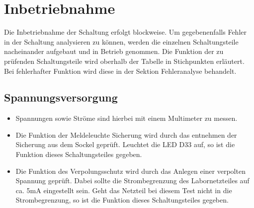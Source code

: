 \section{Inbetriebnahme}



Die Inbetriebnahme der Schaltung erfolgt blockweise. Um gegebenenfalls Fehler in der Schaltung analysieren zu können, werden die einzelnen Schaltungsteile nacheinander aufgebaut und in Betrieb genommen. Die Funktion der zu prüfenden Schaltungsteile wird oberhalb der Tabelle in Stichpunkten erläutert. Bei fehlerhafter Funktion wird diese in der Sektion \glqq Fehleranalyse\grqq{} behandelt.




\subsection{Spannungsversorgung}


\begin{itemize}
	\item{Spannungen sowie Ströme sind hierbei mit einem Multimeter zu messen.}
	
	\item{Die Funktion der \glqq Meldeleuchte Sicherung\grqq{}  wird durch das entnehmen der Sicherung aus dem Sockel geprüft. Leuchtet die LED D33 auf, so ist die Funktion dieses Schaltungsteiles gegeben.}
	
	\item{Die Funktion des Verpolungsschutz wird durch das Anlegen einer verpolten Spannung geprüft. Dabei sollte die Strombegrenzung des Labornetzteiles auf ca. 5mA eingestellt sein. Geht das Netzteil bei diesem Test nicht in die Strombegrenzung, so ist die Funktion dieses Schaltungsteiles gegeben.}
\end{itemize}


